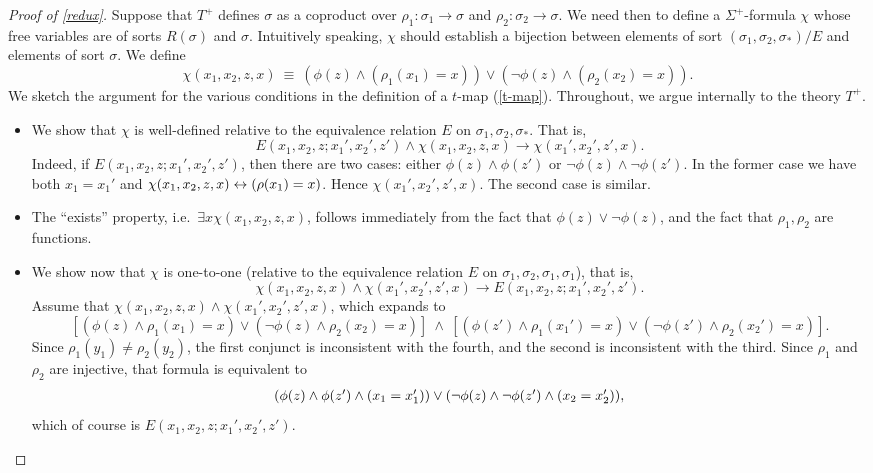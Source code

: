 \begin{proof}[Proof of \ref{redux}]
Suppose that $T^+$ defines $\sigma$ as a coproduct over
$\rho _1:\sigma _1\to\sigma$ and $\rho _2:\sigma _2\to\sigma$.  We
need then to define a $\Sigma ^+$-formula $\chi$ whose free variables
are of sorts $R(\sigma )$ and $\sigma$.  Intuitively speaking, $\chi$
should establish a bijection between elements of sort
$(\sigma _1,\sigma _2,\sigma _\ast )/E$ and elements of sort $\sigma$.
We define
\[ \chi (x_1,x_2,z,x) \: \equiv \: (\phi (z)\wedge (\rho
  _1(x_1)=x))\vee (\neg \phi (z)\wedge (\rho _2(x_2)=x)) .\] We sketch
the argument for the various conditions in the definition of a $t$-map
(\ref{t-map}).  Throughout, we argue internally to the theory $T^+$.
\begin{itemize}
\item We show that $\chi$ is well-defined relative to the equivalence
  relation $E$ on $\sigma _1,\sigma _2,\sigma _\ast$.  That is,
  \[ E(x_1,x_2,z;x_1',x_2',z')\wedge \chi (x_1,x_2,z,x)\to \chi
    (x_1',x_2',z',x) .\] Indeed, if $E(x_1,x_2,z;x_1',x_2',z')$, then
  there are two cases: either $\phi (z)\wedge \phi (z')$ or
  $\neg \phi (z)\wedge \neg \phi (z')$.  In the former case we have
  both $x_1=x_1'$ and $\chi (x_1,x_2,z,x)\leftrightarrow (\rho (x_1)=x)$.  Hence
  $\chi (x_1',x_2',z',x)$.  The second case is similar.

\item The ``exists'' property, i.e.\ $\exists x \chi (x_1,x_2,z,x)$,
  follows immediately from the fact that $\phi (z)\vee\neg\phi (z)$,
  and the fact that $\rho _1,\rho _2$ are functions.

\item We show now that $\chi$ is one-to-one (relative to the
  equivalence relation $E$ on
  $\sigma _1,\sigma _2,\sigma _1,\sigma _1$), that is,
  \[ \chi (x_1,x_2,z,x)\wedge \chi (x_1',x_2',z',x)\to
    E(x_1,x_2,z;x_1',x_2',z') .\] Assume that
  $\chi (x_1,x_2,z,x)\wedge \chi (x_1',x_2',z',x)$, which expands to
  \[ \left[ (\phi (z)\wedge \rho _1(x_1)=x) \vee (\neg \phi (z)\wedge
      \rho _2(x_2)=x)\right] \:\wedge \: \left[ (\phi (z')\wedge \rho
      _1(x_1')=x)\vee (\neg \phi (z')\wedge \rho _2(x_2')=x) \right]
    . \] Since $\rho _1(y_1)\neq \rho _2(y_2)$, the first conjunct is
  inconsistent with the fourth, and the second is inconsistent with
  the third.  Since $\rho _1$ and $\rho _2$ are injective, that
  formula is equivalent to
  \[ \begin{array}{l l l} (\phi (z)\wedge \phi (z')\wedge
      (x_1=x_1'))\vee (\neg \phi (z)\wedge \neg \phi (z')\wedge
      (x_2=x_2')) ,
     \end{array} \] 
   which of course is $E(x_1,x_2,z;x_1',x_2',z')$.


\end{itemize}
\end{proof}
